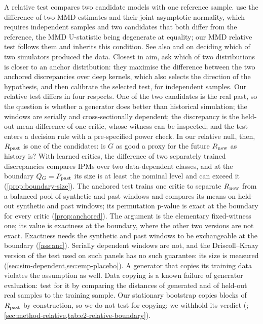 A relative test compares two candidate models with one reference sample.
 use the difference of two MMD estimates and their joint asymptotic
normality, which requires independent \iid{} samples and two candidates that both differ from the
reference, the MMD U-statistic being degenerate at equality; our MMD relative test follows them
and inherits this condition. See also \citet{jitkrittum2018informative} and
\citet{gerber2024likelihood} on deciding which of two simulators produced the data. Closest in
aim, \citet{zhou_2025_anchor} ask which of two distributions is closer to an anchor distribution:
they maximise the difference between the two anchored discrepancies over deep kernels, which also
selects the direction of the hypothesis, and then calibrate the selected test, for independent
samples. Our relative test differs in four respects. One of the two candidates is the real past,
so the question is whether a generator does better than historical simulation; the windows are
serially and cross-sectionally dependent; the discrepancy is the held-out mean difference of one
critic, whose witness can be inspected; and the test enters a decision rule with a pre-specified
power check.
In our relative null, then, $R_{\mathrm{past}}$ is one of the candidates: is $G$ as good a proxy for the future
$R_{\mathrm{new}}$ as history is? With learned critics, the difference of two separately trained
discrepancies compares IPMs over two data-dependent classes, and at the boundary $Q_{G}=P_{\mathrm{past}}$
its size is at least the nominal level and can exceed it (\cref{prop:boundary-size}). The
anchored test trains one critic to separate $R_{\mathrm{new}}$ from a balanced pool of synthetic and past
windows and compares its means on held-out synthetic and past windows; its permutation p-value is
exact at the boundary for every critic (\cref{prop:anchored}). The argument is the elementary
fixed-witness one; its value is exactness at the boundary, where the other two versions are not
exact. Exactness needs the synthetic and past windows to be exchangeable at the boundary
(\cref{ass:anc}). Serially dependent windows are not, and the Driscoll--Kraay version of the test
used on such panels has no such guarantee: its size is measured
(\cref{sec:sim-dependent,sec:emp-placebo}). A generator that copies its training data violates the
assumption as well. Data copying is a known failure of generator evaluation:
\citet{meehan_2020_three} test for it by comparing the distances of generated and of held-out real
samples to the training sample. Our stationary bootstrap copies blocks of $R_{\mathrm{past}}$ by
construction, so we do not test for copying; we withhold its verdict (\INVALID{};
\cref{sec:method-relative,tab:e2-relative-boundary}).

